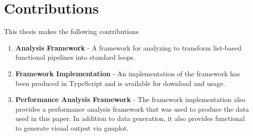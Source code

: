 \section{Contributions}
This thesis makes the following contributions
\begin{enumerate}
  \item \textbf{Analysis Framework} - A framework for analyzing \javascript to transform list-based functional pipelines into standard  loops.
  \item \textbf{Framework Implementation} - An implementation\cite{fpo16} of the framework has been produced in TypeScript and is available for download and usage.
  \item \textbf{Performance Analysis Framework} - The framework implementation also provides a performance analysis framework that was used to produce the data used in this paper.  In addition to data generation, it also provides functional to generate visual output via gnuplot.   
\end{enumerate}